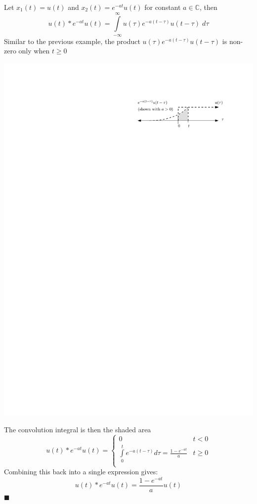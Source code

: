 \begin{example}[$u(t) * e^{-at}u(t)$] Let $x_1(t) = u(t)$ and $x_2(t) = e^{-at}u(t)$ for constant $a\in\mathbb{C}$, then
  \[
u(t) * e^{-at}u(t) = \int\limits_{-\infty}^{\infty} u(\tau)e^{-a(t-\tau)}u(t-\tau) \; d\tau
\]
Similar to the previous example, the product $u(\tau) e^{-a(t-\tau)} u(t-\tau)$ is non-zero only when $t\geq 0$
  \begin{center}
  \includegraphics[scale=1]{graphics/convolution-expstep.pdf}
  \end{center}
  The convolution integral is then the shaded area
  \[
u(t) * e^{-at}u(t) = \left\{ \begin{array}{lc}
  0 & t< 0\\
  \int\limits_{0}^{t} e^{-a(t-\tau)} d\tau = \frac{1-e^{-at}}{a}  & t \geq 0\\
\end{array}\right.
\]
Combining this back into a single expression gives:
\[
u(t) * e^{-at}u(t) = \frac{1-e^{-at}}{a}u(t)
\]
$\blacksquare$
\end{example}

